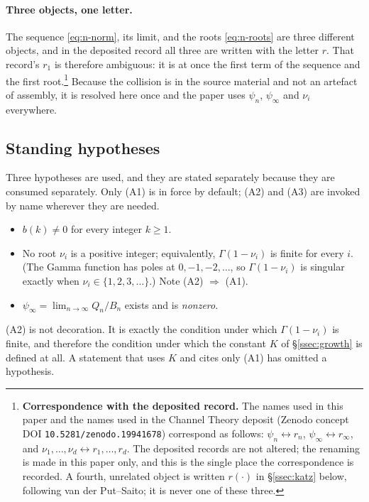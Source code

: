 \paragraph{Three objects, one letter.}
The sequence \eqref{eq:n-norm}, its limit, and the roots \eqref{eq:n-roots} are
three different objects, and in the deposited record all three are written with
the letter $r$. That record's $r_1$ is therefore ambiguous: it is at once the
first term of the sequence and the first root.\footnote{%
  \textbf{Correspondence with the deposited record.} The names used in this
  paper and the names used in the Channel Theory deposit (Zenodo concept DOI
  \texttt{10.5281/zenodo.19941678}) correspond as follows:
  $\psi_n\leftrightarrow r_n$, $\psi_\infty\leftrightarrow r_\infty$, and
  $\nu_1,\dots,\nu_d\leftrightarrow r_1,\dots,r_d$. The deposited
  records are not altered; the renaming is made in this paper only, and this is
  the single place the correspondence is recorded. A fourth, unrelated object
  is written $r(\cdot)$ in \S\ref{ssec:katz} below, following van der
  Put--Saito; it is never one of these three.}
Because the collision is in the source material and not an artefact of
assembly, it is resolved here once and the paper uses $\psi_n$, $\psi_\infty$ and
$\nu_i$ everywhere.

\subsection{Standing hypotheses}\label{ssec:hypotheses}

Three hypotheses are used, and they are stated separately because they are
consumed separately. Only (A1) is in force by default; (A2) and (A3) are
invoked by name wherever they are needed.

\begin{itemize}
\item[\textbf{(A1)}] $b(k)\neq0$ for every integer $k\ge1$.
\item[\textbf{(A2)}] No root $\nu_i$ is a positive integer; equivalently,
  $\Gamma(1-\nu_i)$ is finite for every $i$. (The Gamma function has poles
  at $0,-1,-2,\dots$, so $\Gamma(1-\nu_i)$ is singular exactly when
  $\nu_i\in\{1,2,3,\dots\}$.) Note (A2) $\Rightarrow$ (A1).
\item[\textbf{(A3)}] $\psi_\infty=\lim_{n\to\infty}Q_n/B_n$ exists and is
  \emph{nonzero}.
\end{itemize}

(A2) is not decoration. It is exactly the condition under which
$\Gamma(1-\nu_i)$ is finite, and therefore the condition under which the
constant $K$ of \S\ref{ssec:growth} is defined at all. A statement that uses
$K$ and cites only (A1) has omitted a hypothesis.

